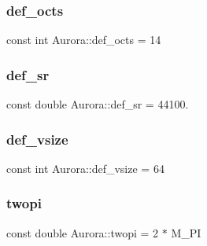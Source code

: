 \subsubsection{\texorpdfstring{def\+\_\+octs}{def\_octs}}
{\footnotesize\ttfamily const int Aurora\+::def\+\_\+octs = 14}

\mbox{\label{namespace_aurora_ad49263d809bea98dd422e95bc91bc03e}} 
\subsubsection{\texorpdfstring{def\+\_\+sr}{def\_sr}}
{\footnotesize\ttfamily const double Aurora\+::def\+\_\+sr = 44100.}

\mbox{\label{namespace_aurora_afaaddf667a06e7ce23c667a8b7295263}} 
\subsubsection{\texorpdfstring{def\+\_\+vsize}{def\_vsize}}
{\footnotesize\ttfamily const int Aurora\+::def\+\_\+vsize = 64}

\mbox{\label{namespace_aurora_a4c08f8416c2b35d5001062f121459b5a}} 
\subsubsection{\texorpdfstring{twopi}{twopi}}
{\footnotesize\ttfamily const double Aurora\+::twopi = 2 $\ast$ M\+\_\+\+PI}

